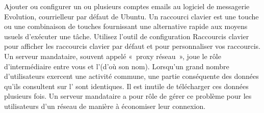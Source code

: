 Ajouter ou configurer un ou plusieurs comptes emails au logiciel de messagerie Evolution, courrielleur par défaut de Ubuntu. 
Un raccourci clavier est une touche ou une combinaison de touches fournissant une alternative rapide aux moyens usuels d'exécuter une tâche. Utilisez l'outil de configuration Raccourcis clavier pour afficher les raccourcis clavier par défaut et pour personnaliser vos raccourcis.
Un serveur mandataire, souvent appelé «~proxy réseau~», joue le rôle d'intermédiaire entre vous et l'(d'où son nom). Lorsqu'un grand nombre d'utilisateurs exercent une activité commune, une partie conséquente des données qu'ils consultent sur l' sont identiques. Il est inutile de télécharger ces données plusieurs fois. Un serveur mandataire a pour rôle de gérer ce problème pour les utilisateurs d'un réseau de manière à économiser leur connexion.\\

